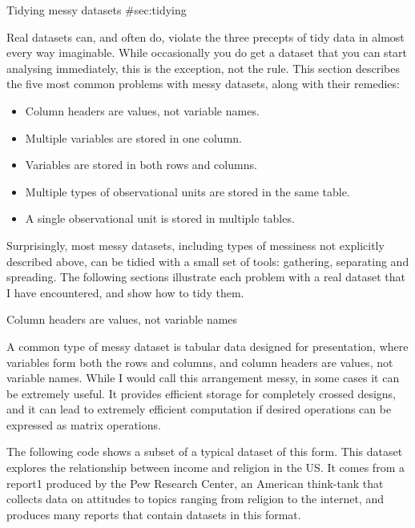 Tidying messy datasets {#sec:tidying}

Real datasets can, and often do, violate the three precepts of tidy data in almost every way imaginable. While occasionally you do get a dataset that you can start analysing immediately, this is the exception, not the rule. This section describes the five most common problems with messy datasets, along with their remedies:

\begin{itemize}
\item Column headers are values, not variable names.
\item Multiple variables are stored in one column.
\item Variables are stored in both rows and columns.
\item Multiple types of observational units are stored in the same table.
\item A single observational unit is stored in multiple tables.
\end{itemize}

Surprisingly, most messy datasets, including types of messiness not explicitly described above, can be tidied with a small set of tools: gathering, separating and spreading. The following sections illustrate each problem with a real dataset that I have encountered, and show how to tidy them.

Column headers are values, not variable names

A common type of messy dataset is tabular data designed for presentation, where variables form both the rows and columns, and column headers are values, not variable names. While I would call this arrangement messy, in some cases it can be extremely useful. It provides efficient storage for completely crossed designs, and it can lead to extremely efficient computation if desired operations can be expressed as matrix operations.

The following code shows a subset of a typical dataset of this form. This dataset explores the relationship between income and religion in the US. It comes from a report1 produced by the Pew Research Center, an American think-tank that collects data on attitudes to topics ranging from religion to the internet, and produces many reports that contain datasets in this format.

